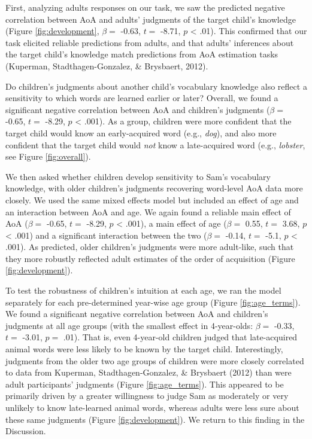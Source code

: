 \documentclass[10pt, letterpaper]{article}
\begin{document}
First, analyzing adults responses on our task, we saw the predicted
negative correlation between AoA and adults' judgments of the target
child's knowledge (Figure \ref{fig:development}, \(\beta =\) -0.63,
\(t =\) -8.71, \(p\) \textless{} .01). This confirmed that our task
elicited reliable predictions from adults, and that adults' inferences
about the target child's knowledge match predictions from AoA estimation
tasks (Kuperman, Stadthagen-Gonzalez, \& Brysbaert, 2012).

Do children's judgments about another child's vocabulary knowledge also
reflect a sensitivity to which words are learned earlier or later?
Overall, we found a significant negative correlation between AoA and
children's judgments (\(\beta =\) -0.65, \(t =\) -8.29, \(p\)
\textless{} .001). As a group, children were more confident that the
target child would know an early-acquired word (e.g., \emph{dog}), and
also more confident that the target child would \emph{not} know a
late-acquired word (e.g., \emph{lobster}, see Figure \ref{fig:overall}).

We then asked whether children develop sensitivity to Sam's vocabulary
knowledge, with older children's judgments recovering word-level AoA
data more closely. We used the same mixed effects model but included an
effect of age and an interaction between AoA and age. We again found a
reliable main effect of AoA (\(\beta =\) -0.65, \(t =\) -8.29, \(p\)
\textless{} .001), a main effect of age (\(\beta =\) 0.55, \(t =\) 3.68,
\(p\) \textless{} .001) and a significant interaction between the two
(\(\beta =\) -0.14, \(t =\) -5.1, \(p\) \textless{} .001). As predicted,
older children's judgments were more adult-like, such that they more
robustly reflected adult estimates of the order of acquisition (Figure
\ref{fig:development}).

To test the robustness of children's intuition at each age, we ran the
model separately for each pre-determined year-wise age group (Figure
\ref{fig:age_terms}). We found a significant negative correlation
between AoA and children's judgments at all age groups (with the
smallest effect in 4-year-olds: \(\beta =\) -0.33, \(t =\) -3.01,
\(p =\) .01). That is, even 4-year-old children judged that
late-acquired animal words were less likely to be known by the target
child. Interestingly, judgments from the older two age groups of
children were more closely correlated to data from Kuperman,
Stadthagen-Gonzalez, \& Brysbaert (2012) than were adult participants'
judgments (Figure \ref{fig:age_terms}). This appeared to be primarily
driven by a greater willingness to judge Sam as moderately or very
unlikely to know late-learned animal words, whereas adults were less
sure about these same judgments (Figure \ref{fig:development}). We
return to this finding in the Discussion.
\end{document}

